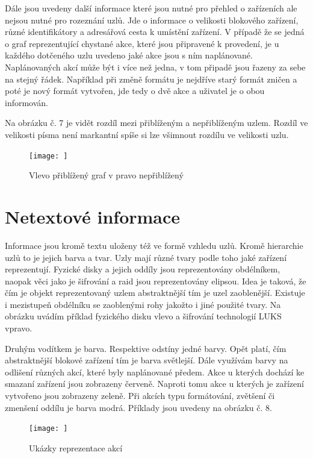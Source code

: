 \documentclass[color,table,oneside,nolot,nolof]{fithesis}
\begin{document}
	Dále jsou uvedeny další informace které jsou nutné pro přehled o zařízeních ale nejsou nutné pro rozeznání uzlů. Jde o informace o velikosti blokového
	zařízení, různé identifikátory a adresářová cesta k umístění zařízení. V případě že se jedná o graf reprezentující chystané akce, které jsou připravené
	k provedení, je u každého dotčeného uzlu uvedeno jaké akce jsou s ním naplánované. Naplánovaných akcí může být i více než jedna, v tom připadě jsou
	řazeny za sebe na stejný řádek. Například při změně formátu je nejdříve starý formát zničen a poté je nový formát vytvořen, jde tedy o dvě akce a 
	uživatel je o obou informován.

  Na obrázku č. 7 je vidět rozdíl mezi přiblíženým a nepřiblíženým uzlem. Rozdíl ve velikosti písma není markantní spíše si lze všimnout rozdílu ve velikosti 
	uzlu.

\begin{figure}[hb]
	\label{fig:Rozdíly uzlů}
	\caption{Vlevo přiblížený graf v pravo nepřiblížený}
	\centering
	\texttt{[image: ]}
\end{figure}
  
\section{Netextové informace}
  Informace jsou kromě textu uloženy též ve formě vzhledu uzlů. Kromě hierarchie uzlů to je jejich barva a tvar. Uzly mají různé tvary podle toho
	jaké zařízení reprezentují. Fyzické disky a jejich oddíly jsou reprezentovány obdélníkem, naopak věci jako je šifrování a raid jsou reprezentovány
	elipsou. Idea je taková, že čím je objekt reprezentovaný uzlem abstraktnější tím je uzel zaoblenější. Existuje i mezistupeň obdélníku se zaoblenými
	rohy jakožto i jiné použité tvary. Na obrázku uvádím příklad fyzického disku vlevo a šifrování technologií LUKS vpravo.

	Druhým vodítkem je barva. Respektive odstíny jedné barvy. Opět platí, čím abstraktnější blokové zařízení tím je barva světlejší. Dále využívám
	barvy na odlišení různých akcí, které byly naplánované předem. Akce u kterých dochází ke smazaní zařízení jsou zobrazeny červeně. Naproti tomu akce
	u kterých je zařízení vytvořeno jsou zobrazeny zeleně. Při akcích typu formátování, zvětšení či zmenšení oddílu je barva modrá. Příklady jsou uvedeny na obrázku č. 8.

\begin{figure}[hb]
	\label{fig:Reprezentace naplánované akce}
	\caption{Ukázky reprezentace akcí}
	\centering
	\texttt{[image: ]}
\end{figure}
  
\end{document}
